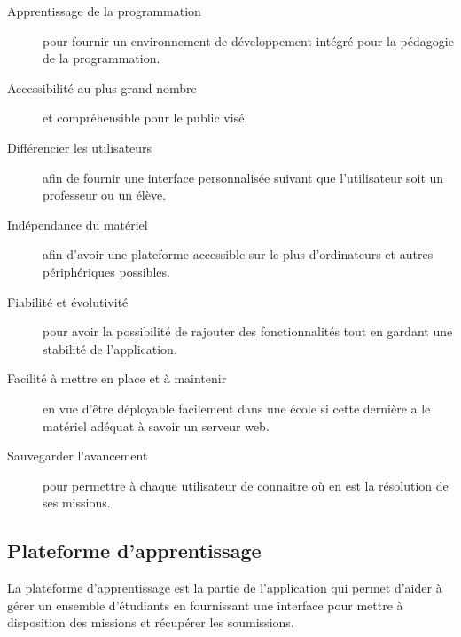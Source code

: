 \begin{description}
  \item[Apprentissage de la programmation] pour fournir un environnement de développement intégré pour la pédagogie de la programmation.
  \item[Accessibilité au plus grand nombre] et compréhensible pour le public visé.
  \item[Différencier les utilisateurs] afin de fournir une interface personnalisée suivant que l'utilisateur soit un professeur ou un élève.
  \item[Indépendance du matériel] afin d'avoir une plateforme accessible sur le plus d'ordinateurs et autres périphériques possibles.
  \item[Fiabilité et évolutivité] pour avoir la possibilité de rajouter des fonctionnalités tout en gardant une stabilité de l'application.
  \item[Facilité à mettre en place et à maintenir] en vue d'être déployable facilement dans une école si cette dernière a le matériel adéquat à savoir un serveur web.
  \item[Sauvegarder l'avancement] pour permettre à chaque utilisateur de connaitre où en est la résolution de ses \glspl{mission}.
\end{description}

\subsection{Plateforme d'apprentissage}
La plateforme d'apprentissage est la partie de l'application qui permet d'aider à gérer un ensemble d'étudiants en fournissant une interface pour mettre à disposition des \glspl{mission} et récupérer les soumissions.

